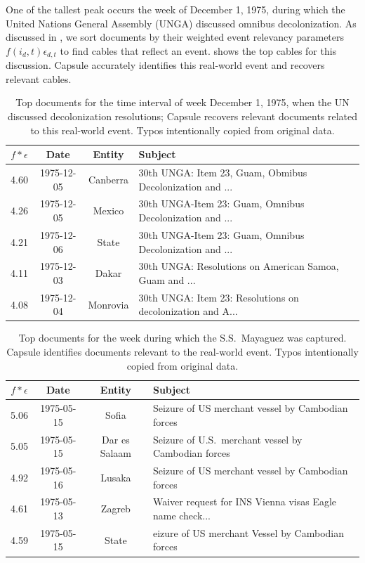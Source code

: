 One of the tallest peak occurs the week of December 1, 1975, during which the United Nations General Assembly (UNGA) discussed omnibus decolonization. 
As discussed in , we sort documents by their weighted event relevancy parameters $f(i_d,t) \epsilon_{d,t}$ to find cables that reflect an event.   shows the top cables for this discussion.  Capsule accurately identifies this real-world event and recovers relevant cables.
\begin{table}[tb]
\small
\centering
\begin{tabular}{cccl}
\toprule
$f *\epsilon$ & \textbf{Date} & \textbf{Entity} & \textbf{Subject} \\
\midrule
4.60 & 1975-12-05 & Canberra & 30th UNGA: Item 23, Guam, Obmibus Decolonization and ... \\
4.26 & 1975-12-05 & Mexico & 30th UNGA-Item 23: Guam, Omnibus Decolonization and ... \\
4.21 & 1975-12-06 & State & 30th UNGA-Item 23: Guam, Omnibus Decolonization and ... \\
4.11 & 1975-12-03 & Dakar & 30th UNGA: Resolutions on American Samoa, Guam and ...\\
4.08 & 1975-12-04 & Monrovia & 30th UNGA: Item 23: Resolutions on decolonization and A...\\
\bottomrule
\end{tabular}
\caption{Top documents for the time interval of week December 1, 1975, when the UN discussed decolonization resolutions; Capsule recovers relevant documents related to this real-world event.  Typos intentionally copied from original data.  }

\label{tab:decol}
\end{table}

\begin{table}[tb]
\small
\centering
\begin{tabular}{cccl}
\toprule 
$f *\epsilon$ & \textbf{Date} & \textbf{Entity} & \textbf{Subject} \\
\midrule
5.06 & 1975-05-15 & Sofia & Seizure of US merchant vessel by Cambodian forces \\
5.05 & 1975-05-15 & Dar es Salaam & Seizure of U.S.~merchant vessel by Cambodian forces \\
4.92 & 1975-05-16 & Lusaka & Seizure of US merchant vessel by Cambodian forces \\
4.61 & 1975-05-13 & Zagreb & Waiver request for INS Vienna visas Eagle name check... \\
4.59 & 1975-05-15 & State & eizure of US merchant Vessel by Cambodian forces \\
\bottomrule
\end{tabular}
\caption{Top documents for the week during which the S.S.~Mayaguez was captured.  Capsule identifies documents relevant to the real-world event.  Typos intentionally copied from original data.  }

\label{tab:mayaguez}
\end{table}

